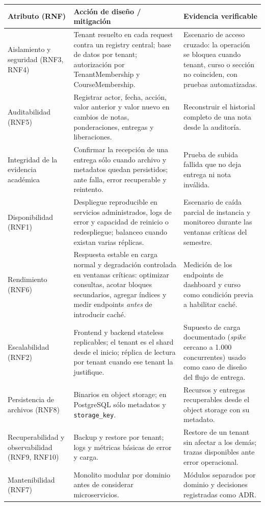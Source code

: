 \documentclass[letterpaper,10pt]{article}
\begin{document}
{\small
\begin{tabularx}{\textwidth}{|p{2.45cm}|Y|Y|}
\hline
\textbf{Atributo (RNF)} & \textbf{Acción de diseño / mitigación} & \textbf{Evidencia verificable} \\
\hline
Aislamiento y seguridad (RNF3, RNF4) & Tenant resuelto en cada request contra un registry central; base de datos por tenant; autorización por TenantMembership y CourseMembership. & Escenario de acceso cruzado: la operación se bloquea cuando tenant, curso o sección no coinciden, con pruebas automatizadas. \\
\hline
Auditabilidad (RNF5) & Registrar actor, fecha, acción, valor anterior y valor nuevo en cambios de notas, ponderaciones, entregas y liberaciones. & Reconstruir el historial completo de una nota desde la auditoría. \\
\hline
Integridad de la evidencia académica & Confirmar la recepción de una entrega sólo cuando archivo y metadatos quedan persistidos; ante falla, error recuperable y reintento. & Prueba de subida fallida que no deja entrega ni nota inválida. \\
\hline
Disponibilidad (RNF1) & Despliegue reproducible en servicios administrados, logs de error y capacidad de reinicio o redespliegue; balanceo cuando existan varias réplicas. & Escenario de caída parcial de instancia y monitoreo durante las ventanas críticas del semestre. \\
\hline
Rendimiento (RNF6) & Respuesta estable en carga normal y degradación controlada en ventanas críticas: optimizar consultas, acotar bloques secundarios, agregar índices y medir endpoints \emph{antes} de introducir caché. & Medición de los endpoints de dashboard y curso como condición previa a habilitar caché. \\
\hline
Escalabilidad (RNF2) & Frontend y backend stateless replicables; el tenant es el shard desde el inicio; réplica de lectura por tenant cuando ese tenant la justifique. & Supuesto de carga documentado (\emph{spike} cercano a 1.000 concurrentes) usado como caso de diseño del flujo de entrega. \\
\hline
Persistencia de archivos (RNF8) & Binarios en object storage; en PostgreSQL sólo metadatos y \texttt{storage\_key}. & Recursos y entregas recuperables desde el object storage con su metadato. \\
\hline
Recuperabilidad y observabilidad (RNF9, RNF10) & Backup y restore por tenant; logs y métricas básicas de error y carga. & Restore de un tenant sin afectar a los demás; trazas disponibles ante error operacional. \\
\hline
Mantenibilidad (RNF7) & Monolito modular por dominio antes de considerar microservicios. & Módulos separados por dominio y decisiones registradas como ADR. \\
\hline
\end{tabularx}}
\end{document}
